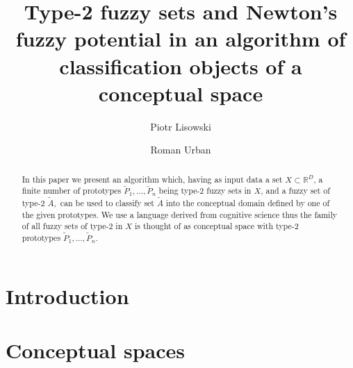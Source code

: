 \documentclass[leqno,12pt]{amsart}
\title[A method of classification]{Type-2 fuzzy sets and Newton's fuzzy potential in an algorithm of classification objects of a conceptual space}
\author[P. Lisowski]{Piotr Lisowski}
\author[R. Urban]{Roman Urban}
\newcommand{\R}{\mathbb{R}}
\theoremstyle{remark}
\theoremstyle{remark}
\theoremstyle{remark}
\theoremstyle{definition}
\numberwithin{equation}{section}
\begin{document}
\begin{abstract}
In this paper we present an algorithm which, having as input data a set $X\subset\R^D$, a finite number of prototypes $\tilde P_1,\ldots,\tilde P_n$ being type-2 fuzzy sets in $X$, and a fuzzy set of type-2 $\tilde A,$ can be used to classify set $\tilde A$ into the conceptual domain defined by one of the given prototypes. We use a language derived from cognitive science thus the family of all fuzzy sets of type-2 in $X$ is thought of as conceptual space with type-2 prototypes $\tilde P_1,\ldots,\tilde P_n.$
\end{abstract}
\maketitle
\section{Introduction}
\section{Conceptual spaces}\label{sconceptual}
\end{document}
